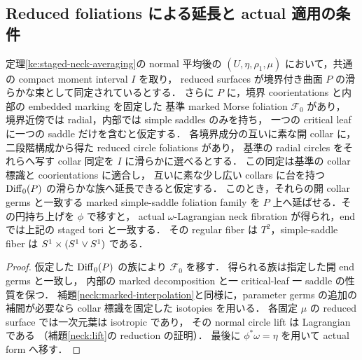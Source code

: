 \subsection{Reduced foliations による延長と actual 適用の条件}

\begin{corollary}
\label{ke:staged-reduced-extension}
定理\ref{ke:staged-neck-averaging}の normal 平均後の
$(U,\eta,\rho_1,\mu)$ において，共通の compact moment interval $I$ を取り，
reduced surfaces が境界付き曲面 $P$ の滑らかな束として同定されているとする．
さらに $P$ に，境界 coorientations と内部の embedded marking を固定した
基準 marked Morse foliation $\mathcal F_0$ があり，
境界近傍では radial，内部では simple saddles のみを持ち，
一つの critical leaf に一つの saddle だけを含むと仮定する．
各境界成分の互いに素な開 collar に，二段階構成から得た reduced circle foliations があり，
基準の radial circles をそれらへ写す collar 同定を $I$ に滑らかに選べるとする．
この同定は基準の collar 標識と coorientations に適合し，
互いに素な少し広い collars に台を持つ $\operatorname{Diff}_0(P)$ の滑らかな族へ延長できると仮定する．
このとき，それらの開 collar germs と一致する marked simple-saddle foliation family を
$P$ 上へ延ばせる．その円持ち上げを $\phi$ で移すと，
actual $\omega$-Lagrangian neck fibration が得られ，end では上記の staged tori と一致する．
その regular fiber は $T^2$，simple-saddle fiber は $S^1\times(S^1\vee S^1)$ である．
\end{corollary}
\begin{proof}
仮定した $\operatorname{Diff}_0(P)$ の族により $\mathcal F_0$ を移す．
得られる族は指定した開 end germs と一致し，
内部の marked decomposition と一 critical-leaf 一 saddle の性質を保つ．
補題\ref{neck:marked-interpolation}と同様に，parameter germs の追加の補間が必要なら
collar 標識を固定した isotopies を用いる．
各固定 $\mu$ の reduced surface では一次元葉は isotropic であり，
その normal circle lift は Lagrangian である
（補題\ref{neck:lift}の reduction の証明）．
最後に $\phi^*\omega=\eta$ を用いて actual form へ移す．
\end{proof}

